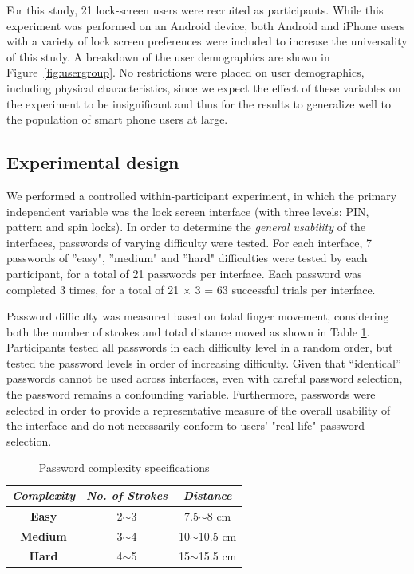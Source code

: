 \documentclass{sigchi}
\begin{document}
For this study, 21 lock-screen users were recruited as participants. While this experiment was performed on an Android device, both Android and iPhone users with a variety of lock screen preferences were included to increase the universality of this study. A breakdown of the user demographics are shown in Figure~\ref{fig:usergroup}. No restrictions were placed on user demographics, including physical characteristics, since we expect the effect of these variables on the experiment to be insignificant and thus for the results to generalize well to the population of smart phone users at large.

\subsection{Experimental design}

We performed a controlled within-participant experiment, in which the primary independent variable was the lock screen interface (with three levels: PIN, pattern and spin locks). In order to determine the \textit{general usability} of the interfaces, passwords of varying difficulty were tested. For each interface, 7 passwords of ''easy", ''medium" and ''hard" difficulties were tested by each participant, for a total of 21 passwords per interface. Each password was completed 3 times, for a total of 21 $\times$ 3 = 63 successful trials per interface. 

Password difficulty was measured based on total finger movement, considering both the number of strokes and total distance moved as shown in Table \ref{tab:tablePassword}. Participants  tested all passwords in each difficulty level in a random order, but tested the password levels in order of increasing difficulty. Given that ``identical'' passwords cannot be used across interfaces, even with careful password selection, the password remains a confounding variable. Furthermore, passwords were selected in order to provide a representative measure of the overall usability of the interface and do not necessarily conform to users' "real-life" password selection. 

\begin{table}[h]
\centering
  \begin{tabular}{c c c}
    \toprule
    \small \textit{Complexity} & 
    \small \textit{No. of Strokes} & 
    \small \textit{Distance}\\
    \midrule
    \small \textbf{Easy} & 2$\sim$3 & 7.5$\sim$8 cm \\
    \midrule
    \small \textbf{Medium} & 3$\sim$4 & 10$\sim$10.5 cm \\
    \midrule
    \small \textbf{Hard} & 4$\sim$5 & 15$\sim$15.5 cm \\
    \bottomrule
  \end{tabular}
  \caption{Password complexity specifications}~\label{tab:tablePassword}
\end{table}
\end{document}
